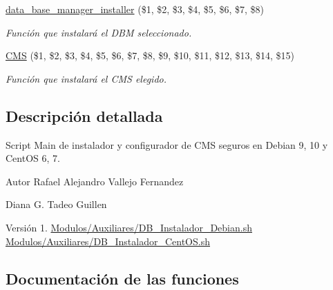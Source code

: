 \begin{DoxyCompactItemize}
\hyperlink{main_8sh_a1978233bd26781aa3df0b7e9ed3cf567}{data\+\_\+base\+\_\+manager\+\_\+installer} (\$1, \$2, \$3, \$4, \$5, \$6, \$7, \$8)
\begin{DoxyCompactList}\small\item\em Función que instalará el D\+BM seleccionado. \end{DoxyCompactList}\item 
\hyperlink{main_8sh_a4c1af093b4f9170c291ae49475cc35b5}{C\+MS} (\$1, \$2, \$3, \$4, \$5, \$6, \$7, \$8, \$9, \$10, \$11, \$12, \$13, \$14, \$15)
\begin{DoxyCompactList}\small\item\em Función que instalará el C\+MS elegido. \end{DoxyCompactList}\end{DoxyCompactItemize}


\subsection{Descripción detallada}
Script Main de instalador y configurador de C\+MS seguros en Debian 9, 10 y Cent\+OS 6, 7. 

\begin{DoxyAuthor}{Autor}
Rafael Alejandro Vallejo Fernandez 

Diana G. Tadeo Guillen 
\end{DoxyAuthor}
\begin{DoxyVersion}{Versión}
1.  \hyperlink{DB__Instalador__Debian_8sh}{Modulos/\+Auxiliares/\+D\+B\+\_\+\+Instalador\+\_\+\+Debian.\+sh}  \hyperlink{DB__Instalador__CentOS_8sh}{Modulos/\+Auxiliares/\+D\+B\+\_\+\+Instalador\+\_\+\+Cent\+O\+S.\+sh} 
\end{DoxyVersion}


\subsection{Documentación de las funciones}
\mbox{\label{main_8sh_a4c1af093b4f9170c291ae49475cc35b5}} 
